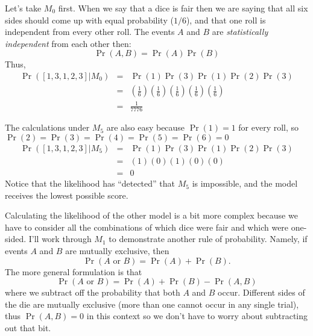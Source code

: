\documentclass[11pt]{article}
\begin{document}
Let's take $M_0$ first. When we say that a dice is fair then we are saying that all six sides should come up with equal probability ($1/6$), and that one roll is independent from every other roll.
The events $A$ and $B$ are {\em statistically independent} from each other then:
$$\Pr(A,B) = \Pr(A)\Pr(B) $$
Thus,
\begin{eqnarray}
	\Pr([1, 3, 1, 2, 3]|M_0) & = & \Pr(1)\Pr(3)\Pr(1)\Pr(2)\Pr(3) \\
		& = & \left(\frac{1}{6}\right)\left(\frac{1}{6}\right)\left(\frac{1}{6}\right)\left(\frac{1}{6}\right)\left(\frac{1}{6}\right) \\
		& = & \frac{1}{7776}
\end{eqnarray}

The calculations under $M_5$ are also easy because $\Pr(1) = 1$ for every roll, so $\Pr(2) = \Pr(3) = \Pr(4) = \Pr(5) = \Pr(6) = 0$ 
\begin{eqnarray}
	\Pr([1, 3, 1, 2, 3]|M_5) & = & \Pr(1)\Pr(3)\Pr(1)\Pr(2)\Pr(3) \\
		& = & \left(1\right)\left(0\right)\left(1\right)\left(0\right)\left(0\right) \\
		& = & 0
\end{eqnarray}
Notice that the likelihood has ``detected'' that $M_5$ is impossible, and the model receives the lowest possible score. 

Calculating the likelihood of the other model is a bit more complex because we have to consider all the combinations of which dice were fair and which were one-sided. I'll work through $M_1$ to demonstrate another rule of probability.
Namely, if events $A$ and $B$ are mutually exclusive, then
$$\Pr(A\mbox{ or } B) = \Pr(A) + \Pr(B).$$
The more general formulation is that 
$$\Pr(A\mbox{ or } B) = \Pr(A) + \Pr(B) - \Pr(A,B)$$
where we subtract off the probability that both $A$ and $B$ occur.  Different sides of the die are mutually exclusive (more than one cannot occur in any single trial), thus $\Pr(A,B)= 0$ in this context so we don't have to worry about subtracting out that bit.
\end{document}
